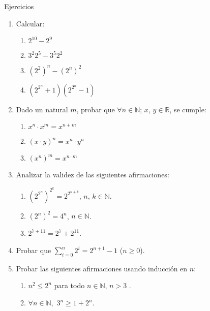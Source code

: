 \begin{section}{Ejercicios}
\begin{enumerate}
        \item Calcular:
        \begin{multicols}{2}
        \begin{enumerate}
            \item \quad $2^{10} - 2^{9}$
            \item \quad $3^2 2^5 - 3^5 2^2$
            \item \quad $(2^2)^n - (2^n)^2$
            \item \quad $(2^{2^n} + 1)  (2^{2^n} - 1)$
        \end{enumerate}
        \end{multicols}

        \item Dado un natural $m$, probar que $\forall n \in {\mathbb N} $; $x$, $y \in {\mathbb R}$, se cumple:
        \begin{multicols}{3}
        \begin{enumerate}
            \item $x^n \cdot x^m = x^{n+m}$
            \item $(x\cdot y)^n=x^n\cdot y^n$
            \item $(x^n)^m = x^{n\cdot m}$
        \end{enumerate}
        \end{multicols}

        \item Analizar la validez de las siguientes afirmaciones:
        \begin{enumerate}
            \item  $(2^{2^n})^{2^k} = 2^{2^{n+k}}$,  $n$, $k \in {\mathbb N}$.
            \item $(2^n)^2 = 4^n$, $n \in {\mathbb N}$.
            \item $2^{7+11} = 2^7 + 2^{11}$.
        \end{enumerate}

        \item Probar que $\sum_{i=0}^n 2^i = 2^{n+1} -1$ ($n \ge 0$). 

        \item Probar las siguientes afirmaciones usando inducción en $n$:
        \begin{enumerate}
            \item $n^2\leq 2^n$ para todo $n\in{\mathbb N}$, $n>3$ .
            \item $\forall n \in {\mathbb N}$,\ $3^n \ge 1 + 2^n$.
        \end{enumerate}


\end{enumerate}
\end{section}
